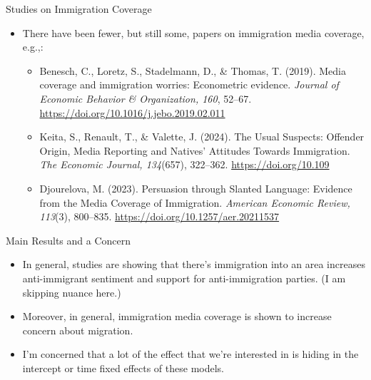 \documentclass[12pt, aspectratio=169]{beamer}
\begin{document}
\begin{frame}{Studies on Immigration Coverage}

    \begin{itemize}
        \item There have been fewer, but still some, papers on immigration media coverage, e.g.,:
            \begin{itemize}
                \item Benesch, C., Loretz, S., Stadelmann, D., \& Thomas, T. (2019). Media coverage and immigration worries: Econometric evidence. \emph{Journal of Economic Behavior \& Organization, 160}, 52–67. \href{https://doi.org/10.1016/j.jebo.2019.02.011}{https://doi.org/10.1016/j.jebo.2019.02.011}
                \item Keita, S., Renault, T., \& Valette, J. (2024). The Usual Suspects: Offender Origin, Media Reporting and Natives’ Attitudes Towards Immigration. \emph{The Economic Journal, 134}(657), 322–362. \href{https://doi.org/10.109}{https://doi.org/10.109}
                \item Djourelova, M. (2023). Persuasion through Slanted Language: Evidence from the Media Coverage of Immigration. \emph{American Economic Review, 113}(3), 800–835. \href{https://doi.org/10.1257/aer.20211537}{https://doi.org/10.1257/aer.20211537}
            \end{itemize}
    \end{itemize}
    
\end{frame}

\begin{frame}{Main Results and a Concern}
    \begin{itemize}
        \item In general, studies are showing that there's immigration into an area 
            increases anti-immigrant sentiment and support for anti-immigration parties. (I am skipping nuance here.)
        \item Moreover, in general, immigration media coverage is shown to 
            increase concern about migration.
        \item I'm concerned that a lot of the effect that we're interested in is 
        hiding in the intercept or time fixed effects of these models.
    \end{itemize}
\end{frame}
\end{document}
